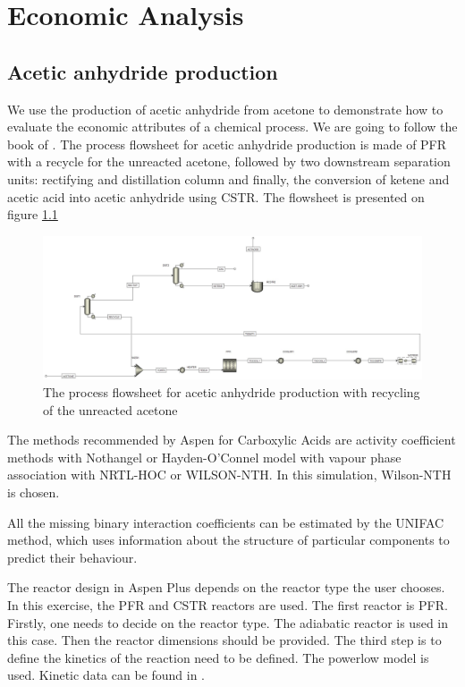 \chapter{Economic Analysis}

\section{Acetic anhydride production}

	We use the production of acetic anhydride from acetone to demonstrate how to evaluate the economic attributes of a chemical process. We are going to follow the book of \cite{AlMalah2016}. The process flowsheet for acetic anhydride production is made of PFR with a recycle for the unreacted acetone, followed by two downstream separation units: rectifying and distillation column and finally, the conversion of ketene and acetic acid into acetic anhydride using CSTR. The flowsheet is presented on figure \ref{fig:Acetic_Flowsheet}
	
	\begin{figure}[h!]
		\centering
		\includegraphics[trim= 0cm 0cm 0cm 0cm,clip,width=\textwidth]{Figures/Econmic_Analysis/Flowsheet.jpg}
		\caption{The process flowsheet for acetic anhydride production with recycling of the unreacted acetone}
		\label{fig:Acetic_Flowsheet}
	\end{figure}

	The methods recommended by Aspen for Carboxylic Acids are activity coefficient methods with Nothangel or Hayden-O'Connel model with vapour phase association with NRTL-HOC or WILSON-NTH. In this simulation, Wilson-NTH is chosen. 
	
	All the missing binary interaction coefficients can be estimated by the UNIFAC method, which uses information about the structure of particular components to predict their behaviour. 
	
	The reactor design in Aspen Plus depends on the reactor type the user chooses. In this exercise, the PFR and CSTR reactors are used. The first reactor is PFR. Firstly, one needs to decide on the reactor type. The adiabatic reactor is used in this case. Then the reactor dimensions should be provided. The third step is to define the kinetics of the reaction need to be defined. The powerlow model is used. Kinetic data can be found in \cite{Fogler1974}. 
	
